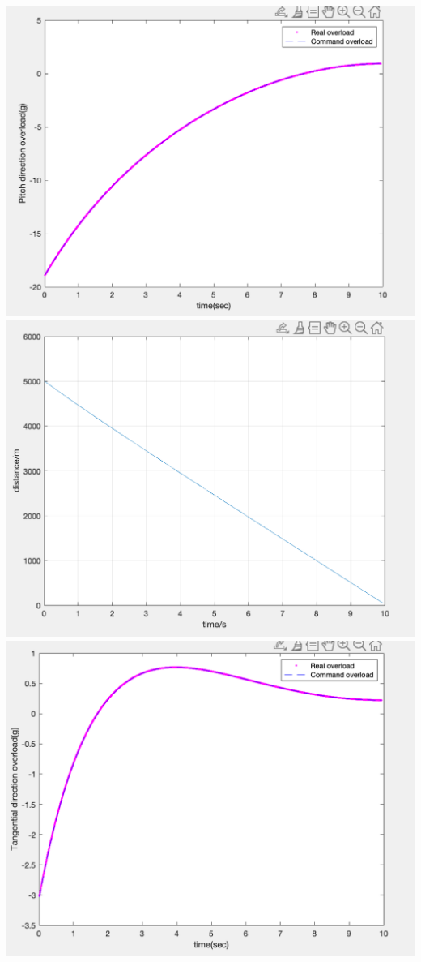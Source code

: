 \documentclass{article}
\begin{document}
\includegraphics[width=\textwidth]{report3.png}
\includegraphics[width=\textwidth]{report5.png}
\includegraphics[width=\textwidth]{report6.png}
\end{document}

